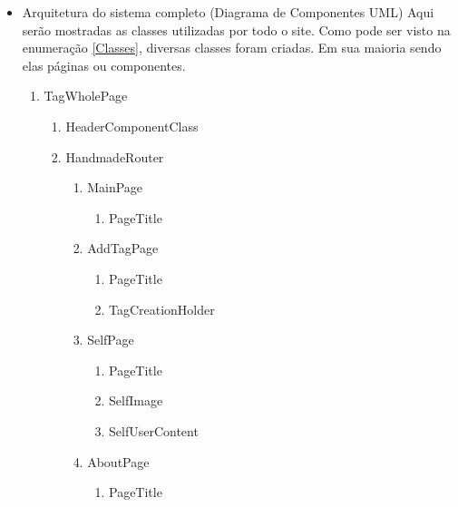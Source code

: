     \begin{itemize}
        \item Arquitetura do sistema completo (Diagrama de Componentes UML)
            Aqui serão mostradas as classes utilizadas por todo o site. Como pode ser visto na enumeração \ref{Classes}, diversas classes foram criadas. Em sua maioria sendo elas páginas ou componentes.
            
            \begin{enumerate}
                \label{Classes}
                \item  TagWholePage
                \begin{enumerate}
                    \item HeaderComponentClass
                    \item HandmadeRouter
                        \begin{enumerate}
                            \item MainPage
                                \begin{enumerate}
                                    \item PageTitle
                                \end{enumerate}
                            \item AddTagPage
                                \begin{enumerate}
                                    \item PageTitle
                                    \item TagCreationHolder
                                \end{enumerate}
                            \item SelfPage
                                \begin{enumerate}
                                    \item PageTitle
                                    \item SelfImage
                                    \item SelfUserContent
                                \end{enumerate}
                            \item AboutPage
                                \begin{enumerate}
                                    \item PageTitle
                                \end{enumerate}

\end{enumerate}
\end{enumerate}
\end{enumerate}
\end{itemize}
